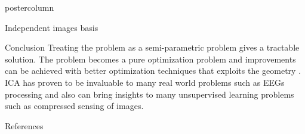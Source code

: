 \documentclass{beamer}
\begin{document}
\begin{frame}
\begin{columns}
\begin{column}{.5\textwidth}
\begin{beamercolorbox}[center]{postercolumn}
\begin{minipage}{.98\textwidth}
{\begin{myblock}{Independent images basis}
					\end{myblock}\vfill
					\begin{myblock}{Conclusion}
						Treating the problem as a semi-parametric problem gives a tractable solution. The problem becomes a pure optimization problem and improvements can be achieved with better optimization techniques that exploits the geometry \cite{Shen2009}.
						\\
						ICA has proven to be invaluable to many real world problems such as EEGs processing and also can bring insights to many unsupervised learning problems such as compressed sensing of images.
					\end{myblock}\vfill
					\begin{myblock}{References}
						\footnotesize
						
						
					\end{myblock}\vfill
		}\end{minipage}\end{beamercolorbox}
	\end{column}
\end{columns}
\end{frame}
\end{document}
